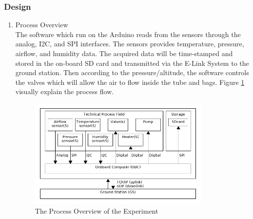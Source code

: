 \subsubsection{Design} \label{sec:4.8.2}
\begin{enumerate}[label=(\alph*)]
\item{Process Overview}\\
The software which run on the Arduino reads from the sensors through the analog, I2C, and SPI interfaces. The sensors provides temperature, pressure, airflow, and humidity data. The acquired data will be time-stamped and stored in the on-board SD card and transmitted via the E-Link System to the ground station. Then according to the pressure/altitude, the software controls the valves which will allow the air to flow inside the tube and bags. Figure \ref{processOverview} visually explain the process flow.

\begin{figure}[H]
    \centering
    \includegraphics[width=0.85\textwidth]{4-experiment-design/img/Process-overview-V0-2.png}
    \caption{The Process Overview of the Experiment}
    \label{processOverview}
\end{figure}


\end{enumerate}
